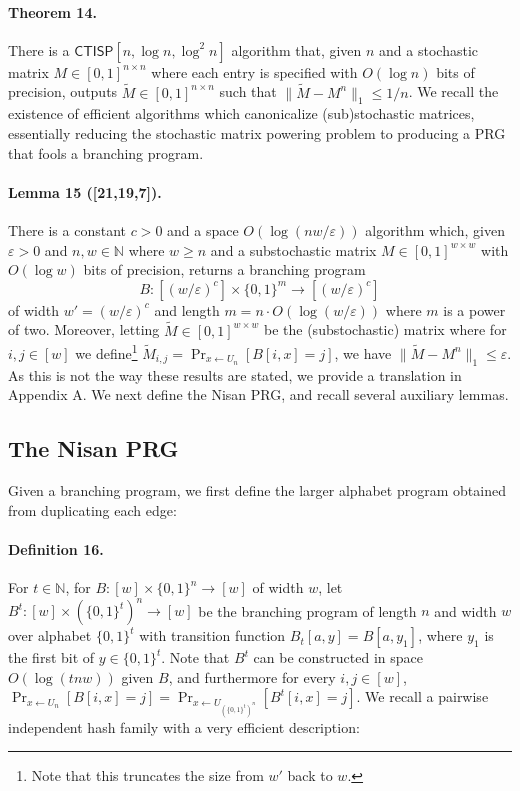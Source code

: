 \paragraph{Theorem 14.} There is a $\mathsf{CTISP}[n,\log n,\log^2 n]$ algorithm that, given $n$ and a stochastic matrix $M\in[0,1]^{n\times n}$ where each entry is specified with $O(\log n)$ bits of precision, outputs $\widetilde M\in[0,1]^{n\times n}$ such that $\|\widetilde M-M^n\|_1\leq1/n$.
We recall the existence of efficient algorithms which canonicalize (sub)stochastic matrices, essentially reducing the stochastic matrix powering problem to producing a PRG that fools a branching program.
\paragraph{Lemma 15 ([21,19,7]).} There is a constant $c>0$ and a space $O(\log(nw/\varepsilon))$ algorithm which, given $\varepsilon>0$ and $n,w\in\mathbb N$ where $w\geq n$ and a substochastic matrix $M\in[0,1]^{w\times w}$ with $O(\log w)$ bits of precision, returns a branching program
\[B:[(w/\varepsilon)^c]\times\{0,1\}^m\to[(w/\varepsilon)^c]\]
of width $w'=(w/\varepsilon)^c$ and length $m=n\cdot O(\log(w/\varepsilon))$ where $m$ is a power of two. Moreover, letting $\widetilde M\in[0,1]^{w\times w}$ be the (substochastic) matrix where for $i,j\in[w]$ we define\footnote{Note that this truncates the size from $w'$ back to $w$.} $\widetilde M_{i,j}=\Pr_{x\leftarrow U_n}[B[i,x]=j]$, we have $\|\widetilde M-M^n\|_1\leq\varepsilon$.
As this is not the way these results are stated, we provide a translation in Appendix A. We next define the Nisan PRG, and recall several auxiliary lemmas.
\subsection*{The Nisan PRG}
Given a branching program, we first define the larger alphabet program obtained from duplicating each edge:
\paragraph{Definition 16.} For $t\in\mathbb N$, for $B:[w]\times\{0,1\}^n\to[w]$ of width $w$, let $B^t:[w]\times(\{0,1\}^t)^n\to[w]$ be the branching program of length $n$ and width $w$ over alphabet $\{0,1\}^t$ with transition function $B_t[a,y]=B[a,y_1]$, where $y_1$ is the first bit of $y\in\{0,1\}^t$. Note that $B^t$ can be constructed in space $O(\log(tnw))$ given $B$, and furthermore for every $i,j\in[w]$, $\Pr_{x\leftarrow U_n}[B[i,x]=j]=\Pr_{x\leftarrow U_{(\{0,1\}^t)^n}}[B^t[i,x]=j]$.
We recall a pairwise independent hash family with a very efficient description:
